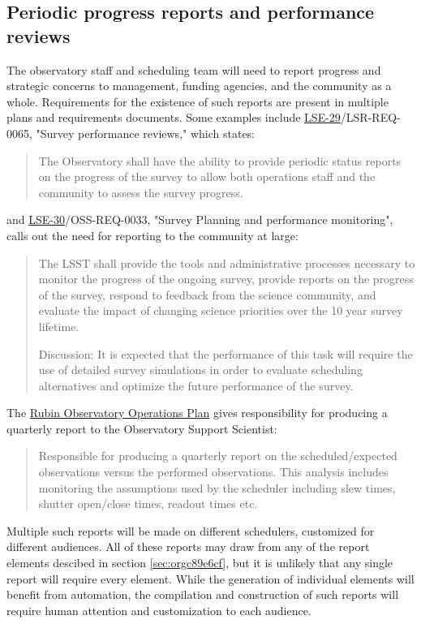 \subsection{Periodic progress reports and performance reviews}
\label{sec:orgd815393}
The observatory staff and scheduling team will need to report progress and strategic concerns to management, funding agencies, and the community as a whole. Requirements for the existence of such reports are present in multiple plans and requirements documents. Some examples include \href{https://ls.st/lse-29}{LSE-29}/LSR-REQ-0065, "Survey performance reviews," which states:
\begin{quote}
The Observatory shall have the ability to provide periodic status reports on the progress of the survey to allow both operations staff and the community to assess the survey progress.
\end{quote}
and \href{https://ls.st/lse-30}{LSE-30}/OSS-REQ-0033, "Survey Planning and performance monitoring", calls out the need for reporting to the community at large:
\begin{quote}
The LSST shall provide the tools and administrative processes necessary to monitor the progress of the ongoing survey, provide reports on the progress of the survey, respond to feedback from the science community, and evaluate the impact of changing science priorities over the 10 year survey lifetime.

Discussion: It is expected that the performance of this task will require the use of detailed survey simulations in order to evaluate scheduling alternatives and optimize the future performance of the survey.
\end{quote}

The \href{https://docushare.lsst.org/docushare/dsweb/Get/Document-36797/Rubin\%20Observatory\%20Operations\%20Plan\%20April\%202020.pdf}{Rubin Observatory Operations Plan} gives responsibility for producing a quarterly report to the Observatory Support Scientist:
\begin{quote}
Responsible for producing a quarterly report on the scheduled/expected observations versus the performed observations. This analysis includes monitoring the assumptions used by the scheduler including slew times, shutter open/close times, readout times etc. 
\end{quote}

Multiple such reports will be made on different schedulers, customized for different audiences.
All of these reports may draw from any of the report elements descibed in section \ref{sec:orgc89e6cf}, but it is unlikely that any single report will require every element.
While the generation of individual elements will benefit from automation, the compilation and construction of such reports will require human attention and customization to each audience.

